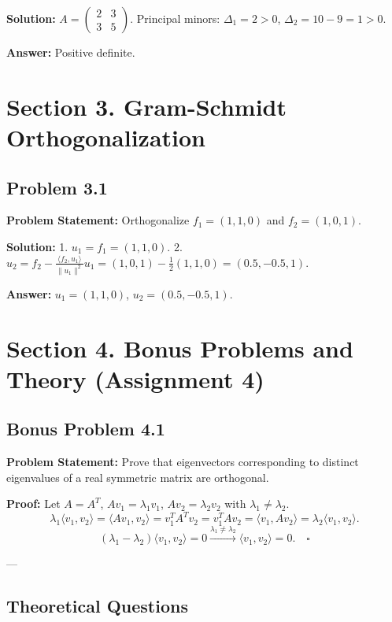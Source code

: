 \documentclass[11pt, a4paper]{article}
\begin{document}
\textbf{Solution:}
$A = \begin{pmatrix} 2 & 3 \\ 3 & 5 \end{pmatrix}$.
Principal minors: $\Delta_1 = 2 > 0$, $\Delta_2 = 10 - 9 = 1 > 0$.

\textbf{Answer:} Positive definite.

\newpage

\section{Section 3. Gram-Schmidt Orthogonalization}

\subsection*{Problem 3.1}
\textbf{Problem Statement:} Orthogonalize $f_1 = (1, 1, 0)$ and $f_2 = (1, 0, 1)$.

\textbf{Solution:}
1. $u_1 = f_1 = (1, 1, 0)$.
2. $u_2 = f_2 - \frac{\langle f_2, u_1 \rangle}{\|u_1\|^2} u_1 = (1, 0, 1) - \frac{1}{2}(1, 1, 0) = (0.5, -0.5, 1)$.

\textbf{Answer:} $u_1 = (1, 1, 0)$, $u_2 = (0.5, -0.5, 1)$.

\newpage

\section{Section 4. Bonus Problems and Theory (Assignment 4)}

\subsection*{Bonus Problem 4.1}
\textbf{Problem Statement:} Prove that eigenvectors corresponding to distinct eigenvalues of a real symmetric matrix are orthogonal.

\textbf{Proof:}
Let $A = A^T$, $Av_1 = \lambda_1 v_1$, $Av_2 = \lambda_2 v_2$ with $\lambda_1 \ne \lambda_2$.
$$ \lambda_1 \langle v_1, v_2 \rangle = \langle Av_1, v_2 \rangle = v_1^T A^T v_2 = v_1^T A v_2 = \langle v_1, Av_2 \rangle = \lambda_2 \langle v_1, v_2 \rangle. $$
$$ (\lambda_1 - \lambda_2) \langle v_1, v_2 \rangle = 0 \xrightarrow{\lambda_1 \neq \lambda_2} \langle v_1, v_2 \rangle = 0. \quad \square $$

---

\subsection*{Theoretical Questions}
\end{document}
